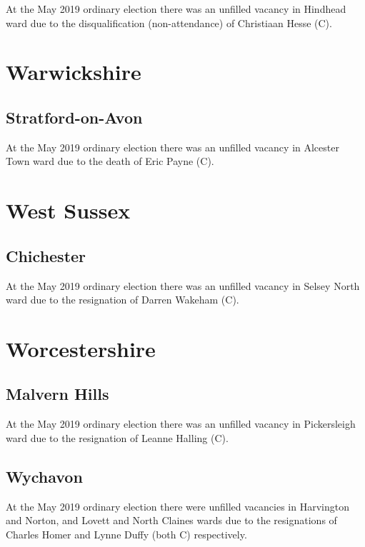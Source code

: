 \documentclass[a4paper,openany]{book}
\begin{document}
\begin{resultsiii}
At the May 2019 ordinary election there was an unfilled vacancy in Hindhead ward due to the disqualification (non-attendance) of Christiaan Hesse (C).

\section{Warwickshire}

\subsection*{Stratford-on-Avon}

At the May 2019 ordinary election there was an unfilled vacancy in Alcester Town ward due to the death of Eric Payne (C).

\section{West Sussex}

\subsection*{Chichester}

At the May 2019 ordinary election there was an unfilled vacancy in Selsey North ward due to the resignation of Darren Wakeham (C).

\section{Worcestershire}

\subsection*{Malvern Hills}

At the May 2019 ordinary election there was an unfilled vacancy in Pickersleigh ward due to the resignation of Leanne Halling (C).

\subsection*{Wychavon}

At the May 2019 ordinary election there were unfilled vacancies in Harvington and Norton, and Lovett and North Claines wards due to the resignations of Charles Homer and Lynne Duffy (both C) respectively.


\end{resultsiii}
\end{document}
